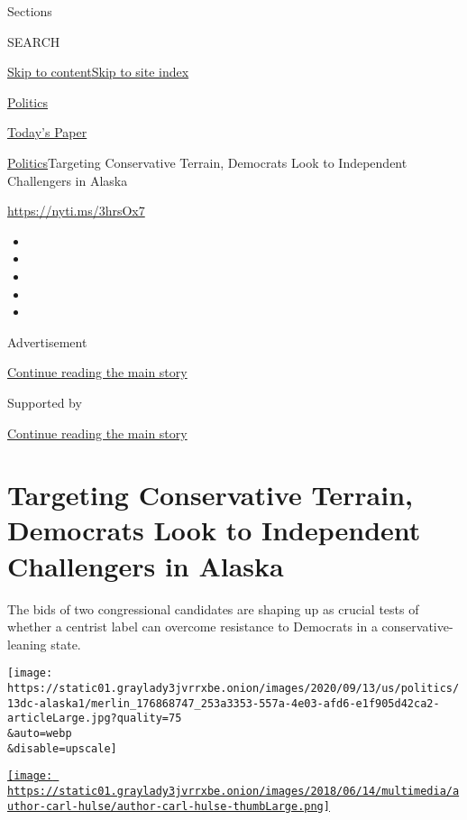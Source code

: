 Sections

SEARCH

\protect\hyperlink{site-content}{Skip to
content}\protect\hyperlink{site-index}{Skip to site index}

\href{https://www.nytimes3xbfgragh.onion/section/politics}{Politics}

\href{https://myaccount.nytimes3xbfgragh.onion/auth/login?response_type=cookie\&client_id=vi}{}

\href{https://www.nytimes3xbfgragh.onion/section/todayspaper}{Today's
Paper}

\href{/section/politics}{Politics}\textbar{}Targeting Conservative
Terrain, Democrats Look to Independent Challengers in Alaska

\url{https://nyti.ms/3hrsOx7}

\begin{itemize}
\item
\item
\item
\item
\item
\end{itemize}

Advertisement

\protect\hyperlink{after-top}{Continue reading the main story}

Supported by

\protect\hyperlink{after-sponsor}{Continue reading the main story}

\hypertarget{targeting-conservative-terrain-democrats-look-to-independent-challengers-in-alaska}{%
\section{Targeting Conservative Terrain, Democrats Look to Independent
Challengers in
Alaska}\label{targeting-conservative-terrain-democrats-look-to-independent-challengers-in-alaska}}

The bids of two congressional candidates are shaping up as crucial tests
of whether a centrist label can overcome resistance to Democrats in a
conservative-leaning state.

\texttt{[image: https://static01.graylady3jvrrxbe.onion/images/2020/09/13/us/politics/13dc-alaska1/merlin\_176868747\_253a3353-557a-4e03-afd6-e1f905d42ca2-articleLarge.jpg?quality=75\\\&auto=webp\\\&disable=upscale]}

\href{https://www.nytimes3xbfgragh.onion/by/carl-hulse}{\texttt{[image: https://static01.graylady3jvrrxbe.onion/images/2018/06/14/multimedia/author-carl-hulse/author-carl-hulse-thumbLarge.png]}}

